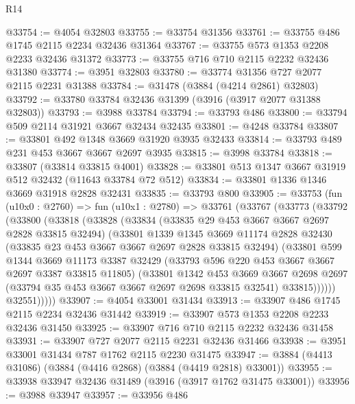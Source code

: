 \begin{lexlean}{R14}
\begin{coremodule}
@33754 := @4054 @32803
@33755 := @33754 @31356
@33761 := @33755 @486 @1745 @2115 @2234 @32436 @31364
@33767 := @33755 @573 @1353 @2208 @2233 @32436 @31372
@33773 := @33755 @716 @710 @2115 @2232 @32436 @31380
@33774 := @3951 @32803
@33780 := @33774 @31356 @727 @2077 @2115 @2231 @31388
@33784 := @31478 (@3884 (@4214 @2861) @32803)
@33792 := @33780 @33784 @32436 @31399 (@3916 (@3917 @2077 @31388 @32803))
@33793 := @3988 @33784
@33794 := @33793 @486
@33800 := @33794 @509 @2114 @31921 @3667 @32434 @32435
@33801 := @4248 @33784
@33807 := @33801 @492 @1348 @3669 @31920 @3935 @32433
@33814 := @33793 @489 @231 @453 @3667 @3667 @2697 @3935
@33815 := @3998 @33784
@33818 := @33807 (@33814 @33815 @4001)
@33828 := @33801 @513 @1347 @3667 @31919 @512 @32432 (@11643 @33784 @72 @512)
@33834 := @33801 @1336 @1346 @3669 @31918 @2828 @32431
@33835 := @33793 @800
@33905 := @33753
    (fun (u10x0 : @2760) =>
    fun (u10x1 : @2780) =>
    @33761
      (@33767
        (@33773
          (@33792
            (@33800
              (@33818
                (@33828
                  (@33834
                    (@33835 @29 @453 @3667 @3667 @2697 @2828 @33815 @32494)
                    (@33801
                      @1339
                      @1345
                      @3669
                      @11174
                      @2828
                      @32430
                      (@33835 @23 @453 @3667 @3667 @2697 @2828 @33815 @32494)
                      (@33801
                        @599
                        @1344
                        @3669
                        @11173
                        @3387
                        @32429
                        (@33793 @596 @220 @453 @3667 @3667 @2697 @3387 @33815 @11805)
                        (@33801
                          @1342
                          @453
                          @3669
                          @3667
                          @2698
                          @2697
                          (@33794 @35 @453 @3667 @3667 @2697 @2698 @33815 @32541)
                          @33815))))))
              @32551)))))
@33907 := @4054 @33001 @31434
@33913 := @33907 @486 @1745 @2115 @2234 @32436 @31442
@33919 := @33907 @573 @1353 @2208 @2233 @32436 @31450
@33925 := @33907 @716 @710 @2115 @2232 @32436 @31458
@33931 := @33907 @727 @2077 @2115 @2231 @32436 @31466
@33938 := @3951 @33001 @31434 @787 @1762 @2115 @2230 @31475
@33947 := @3884 (@4413 @31086) (@3884 (@4416 @2868) (@3884 (@4419 @2818) @33001))
@33955 := @33938 @33947 @32436 @31489 (@3916 (@3917 @1762 @31475 @33001))
@33956 := @3988 @33947
@33957 := @33956 @486

\end{coremodule}
\end{lexlean}
